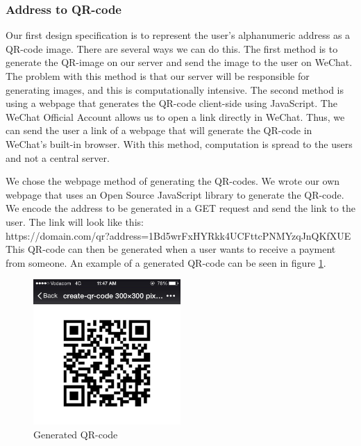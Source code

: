 \subsubsection{Address to QR-code}
Our first design specification is to represent the user's alphanumeric address as a QR-code image. There are several ways we can do this. The first method is to generate the QR-image on our server and send the image to the user on WeChat. The problem with this method is that our server will be responsible for generating images, and this is computationally intensive. The second method is using a webpage that generates the QR-code client-side using JavaScript. The WeChat Official Account allows us to open a link directly in WeChat. Thus, we can send the user a link of a webpage that will generate the QR-code in WeChat's built-in browser. With this method, computation is spread to the users and not a central server. 

We chose the webpage method of generating the QR-codes. We wrote our own webpage that uses an Open Source JavaScript library to generate the QR-code. We encode the address to be generated in a GET request and send the link to the user. The link will look like this: \\https://domain.com/qr?address=1Bd5wrFxHYRkk4UCFttcPNMYzqJnQKfXUE\\This QR-code can then be generated when a user wants to receive a payment from someone. An example of a generated QR-code can be seen in figure \ref{fig:qr_code}.

\begin{figure}
  \centering
    \includegraphics[width=0.5\textwidth]{figs/qr_code.jpg}
   \caption{Generated QR-code} 
   \label{fig:qr_code}
\end{figure}

